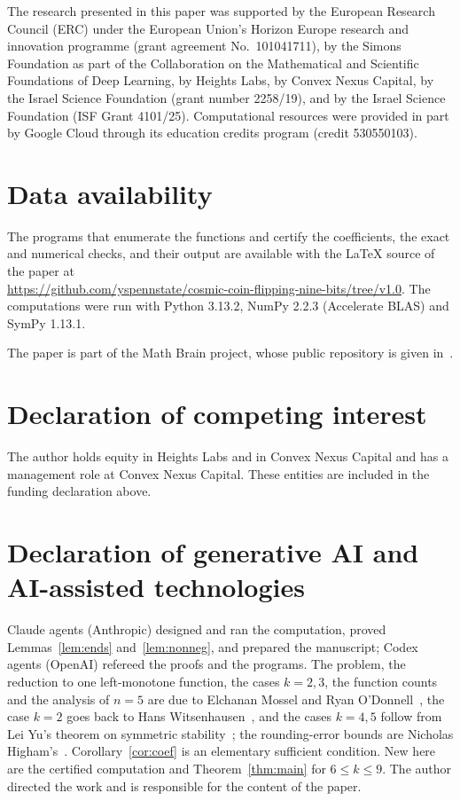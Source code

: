 \documentclass[11pt]{amsart}
\theoremstyle{remark}
\begin{document}
The research presented in this paper was supported by the European Research Council (ERC) under the European Union's
Horizon Europe research and innovation programme (grant agreement No.~101041711), by the Simons Foundation as part of
the Collaboration on the Mathematical and Scientific Foundations of Deep Learning, by Heights Labs, by Convex Nexus
Capital, by the Israel Science Foundation (grant number 2258/19), and by the Israel Science Foundation (ISF Grant
4101/25). Computational resources were provided in part by Google Cloud through its education credits program (credit
530550103).

\section*{Data availability}
The programs that enumerate the functions and certify the coefficients, the exact and numerical checks, and their
output are available with the \LaTeX{} source of the paper at\\
\url{https://github.com/yspennstate/cosmic-coin-flipping-nine-bits/tree/v1.0}.
The computations were run with Python 3.13.2, NumPy 2.2.3 (Accelerate BLAS) and SymPy 1.13.1.

The paper is part of the Math Brain project, whose public repository is given in~\cite{MathBrainRepo}.

\section*{Declaration of competing interest}
The author holds equity in Heights Labs and in Convex Nexus Capital and has a management role at Convex Nexus Capital.
These entities are included in the funding declaration above.

\section*{Declaration of generative AI and AI-assisted technologies}
Claude agents (Anthropic) designed and ran the computation, proved Lemmas~\ref{lem:ends} and~\ref{lem:nonneg}, and
prepared the manuscript; Codex agents (OpenAI) refereed the proofs and the programs. The problem, the reduction to one
left-monotone function, the cases $k=2,3$, the function counts and the analysis of $n=5$ are due to Elchanan Mossel and
Ryan O'Donnell~\cite{MO05}, the case $k=2$ goes back to Hans Witsenhausen~\cite{W75}, and the cases $k=4,5$ follow from
Lei Yu's theorem on symmetric stability~\cite{Yu23}; the rounding-error bounds are Nicholas Higham's~\cite{Hig02}.
Corollary~\ref{cor:coef} is an elementary sufficient condition. New here are the certified computation and
Theorem~\ref{thm:main} for $6\le k\le9$. The author directed the work and is responsible for the content of the
paper.
\end{document}
